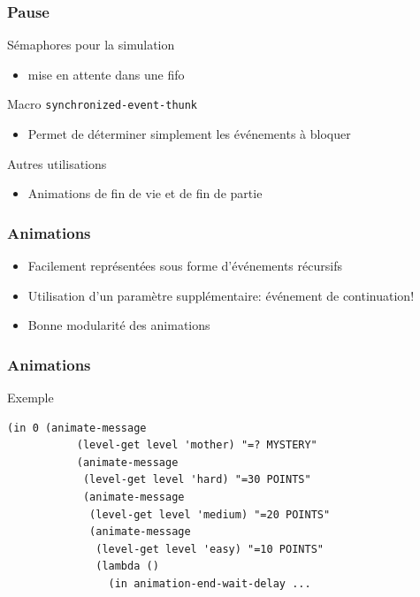 \documentclass{beamer}
\newcommand{\<}[1]{\`#1}
\begin{document}
\begin{frame}
  \frametitle{Pause}

  \begin{block}{Sémaphores pour la simulation}
    \begin{itemize}
      \item mise en attente dans une fifo
    \end{itemize}
  \end{block}

  \begin{block}{Macro \texttt{synchronized-event-thunk}}
    \begin{itemize}
      \item Permet de déterminer simplement les événements à bloquer
    \end{itemize}
  \end{block}

  \begin{block}{Autres utilisations}
    \begin{itemize}
      \item Animations de fin de vie et de fin de partie
    \end{itemize}
  \end{block}
\end{frame}


\begin{frame}
  \frametitle{Animations}
  \begin{itemize}
  \item Facilement représentées sous forme d'événements récursifs
  \item Utilisation d'un paramètre supplémentaire: événement de
    \alert{continuation}!
  \item Bonne modularité des animations
  \end{itemize}
\end{frame}

\begin{frame}[fragile]
  \frametitle{Animations}
  \begin{block}{Exemple}
    \begin{lstlisting}[basicstyle=\footnotesize]
(in 0 (animate-message
           (level-get level 'mother) "=? MYSTERY"
           (animate-message
            (level-get level 'hard) "=30 POINTS"
            (animate-message
             (level-get level 'medium) "=20 POINTS"
             (animate-message
              (level-get level 'easy) "=10 POINTS"
              (lambda ()
                (in animation-end-wait-delay ...
    \end{lstlisting}
  \end{block}
\end{frame}
\end{document}
